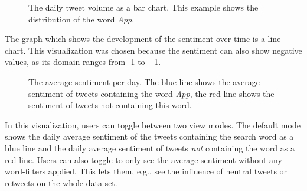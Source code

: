 \begin{figure}[h!tb]
    \caption{The daily tweet volume as a bar chart. This example shows the distribution of the word \emph{App}.}
    \label{fig:volume_barchart}
\end{figure}

The graph which shows the development of the sentiment over time is a line chart. This visualization was chosen because the sentiment can also show negative values, as its domain ranges from -1 to +1. 

\begin{figure}[h!tb]
    \caption{The average sentiment per day. The blue line shows the average sentiment of tweets containing the word \emph{App}, the red line shows the sentiment of tweets not containing this word.}
    \label{fig:sentiment_linechart}
\end{figure}

In this visualization, users can toggle between two view modes. The default mode shows the daily average sentiment of the tweets containing the search word as a blue line and the daily average sentiment of tweets \emph{not} containing the word as a red line. Users can also toggle to only see the average sentiment without any word-filters applied. This lets them, e.g., see the influence of neutral tweets or retweets on the whole data set.

